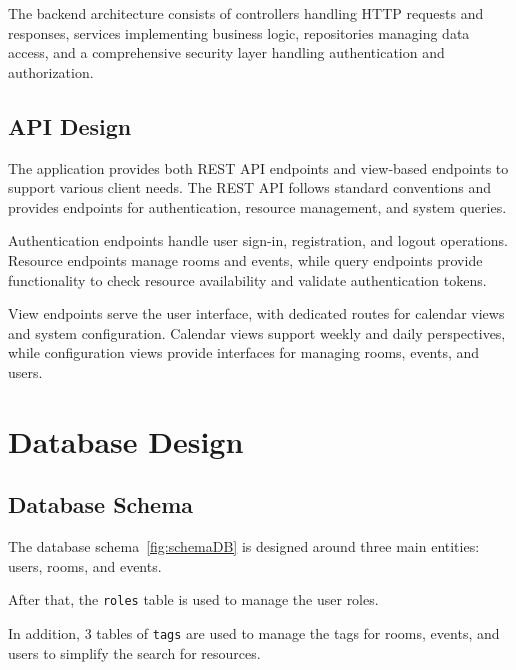 The backend architecture consists of controllers handling HTTP requests and responses, services implementing business logic, repositories managing data access, and a comprehensive security layer handling authentication and authorization.

\subsection{API Design}\label{subsec:api-design}

The application provides both REST API endpoints and view-based endpoints to support various client needs.
The REST API follows standard conventions and provides endpoints for authentication, resource management, and system queries.

Authentication endpoints handle user sign-in, registration, and logout operations.
Resource endpoints manage rooms and events, while query endpoints provide functionality to check resource availability and validate authentication tokens.

View endpoints serve the user interface, with dedicated routes for calendar views and system configuration.
Calendar views support weekly and daily perspectives, while configuration views provide interfaces for managing rooms, events, and users.

\section{Database Design}\label{sec:database-design}

\subsection{Database Schema}\label{subsec:database-schema}
The database schema~\ref{fig:schemaDB} is designed around three main entities: users, rooms, and events.

After that, the \texttt{roles} table is used to manage the user roles.

In addition, 3 tables of \texttt{tags} are used to manage the tags for rooms, events, and users to simplify the search for resources.

